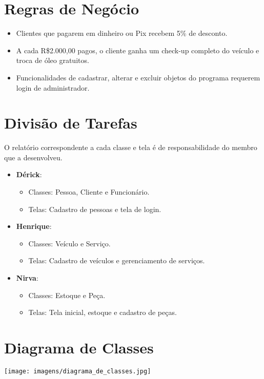 \documentclass[a4paper,12pt]{article}
\begin{document}
\section{Regras de Negócio}

\begin{itemize}[noitemsep]
    \item Clientes que pagarem em dinheiro ou Pix recebem 5\% de desconto.
    \item A cada R\$2.000,00 pagos, o cliente ganha um check-up completo do veículo e troca de óleo gratuitos.
    \item Funcionalidades de cadastrar, alterar e excluir objetos do programa requerem login de administrador.
\end{itemize}

\section{Divisão de Tarefas}

O relatório correspondente a cada classe e tela é de responsabilidade do membro que a desenvolveu.

\begin{itemize}[noitemsep]
    \item \textbf{Dérick}:
    \begin{itemize}[noitemsep]
        \item Classes: Pessoa, Cliente e Funcionário.
        \item Telas: Cadastro de pessoas e tela de login.
    \end{itemize}
    \item \textbf{Henrique}:
    \begin{itemize}[noitemsep]
        \item Classes: Veículo e Serviço.
        \item Telas: Cadastro de veículos e gerenciamento de serviços.
    \end{itemize}
    \item \textbf{Nirva}:
    \begin{itemize}[noitemsep]
        \item Classes: Estoque e Peça.
        \item Telas: Tela inicial, estoque e cadastro de peças.
    \end{itemize}
\end{itemize}

\section{Diagrama de Classes}

\texttt{[image: imagens/diagrama\_de\_classes.jpg]}
\end{document}
